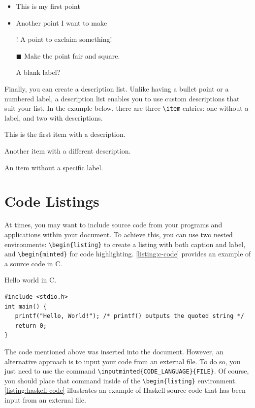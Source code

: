 \begin{itemize}
  \item This is my first point
  \item Another point I want to make 
  \item[!] A point to exclaim something!
  \item[$\blacksquare$] Make the point fair and square.
  \item[] A blank label?
\end{itemize}

Finally, you can create a description list. Unlike having a bullet point or a numbered label, a description list enables you to use custom descriptions that suit your list. In the example below, there are three \verb|\item| entries: one without a label, and two with descriptions.

\begin{description}
    \item[Item 1:] This is the first item with a description.
    \item[Item 2:] Another item with a different description.
    \item An item without a specific label.
\end{description}

\section{Code Listings}
At times, you may want to include source code from your programs and applications within your document. To achieve this, you can use two nested environments: \verb|\begin{listing}| to create a listing with both caption and label, and \verb|\begin{minted}| for code highlighting. \autoref{listing:c-code} provides an example of a source code in C.

\begin{listing}[!htpb]
\caption{Hello world in C.}
\label{listing:c-code}
\begin{verbatim}
#include <stdio.h>
int main() {
   printf("Hello, World!"); /* printf() outputs the quoted string */
   return 0;
}
\end{verbatim}
\end{listing}

The code mentioned above was inserted into the document. However, an alternative approach is to input your code from an external file. To do so, you just need to use the command \verb|\inputminted{CODE_LANGUAGE}{FILE}|. Of course, you should place that command inside of the \verb|\begin{listing}| environment. \autoref{listing:haskell-code} illustrates an example of Haskell source code that has been input from an external file.

